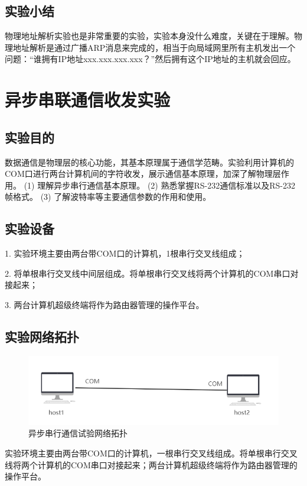 \documentclass[lang=cn,11pt,a4paper,cite=authoryear]{elegantpaper}
\begin{document}
\subsection{实验小结}
物理地址解析实验也是非常重要的实验，实验本身没什么难度，关键在于理解。物理地址解析是通过广播ARP消息来完成的，相当于向局域网里所有主机发出一个问题：“谁拥有IP地址xxx.xxx.xxx.xxx？”然后拥有这个IP地址的主机就会回应。


\section{异步串联通信收发实验}
\subsection{实验目的}
数据通信是物理层的核心功能，其基本原理属于通信学范畴。实验利用计算机的COM口进行两台计算机间的字符收发，展示通信基本原理，加深了解物理层作用。
(1)	理解异步串行通信基本原理。
(2)	熟悉掌握RS-232通信标准以及RS-232帧格式。
(3)	了解波特率等主要通信参数的作用和使用。

\subsection{实验设备}

1. 实验环境主要由两台带COM口的计算机，1根串行交叉线组成；

2. 将单根串行交叉线中间层组成。将单根串行交叉线将两个计算机的COM串口对接起来；

3. 两台计算机超级终端将作为路由器管理的操作平台。

\subsection{实验网络拓扑}

\begin{figure}[htbp]
	\centering
	\includegraphics[width=0.7\linewidth]{image/screenshot013}
	\caption{异步串行通信试验网络拓扑}
	\label{fig:screenshot013}
\end{figure}

实验环境主要由两台带COM口的计算机，一根串行交叉线组成。将单根串行交叉线将两个计算机的COM串口对接起来；两台计算机超级终端将作为路由器管理的操作平台。
\end{document}
